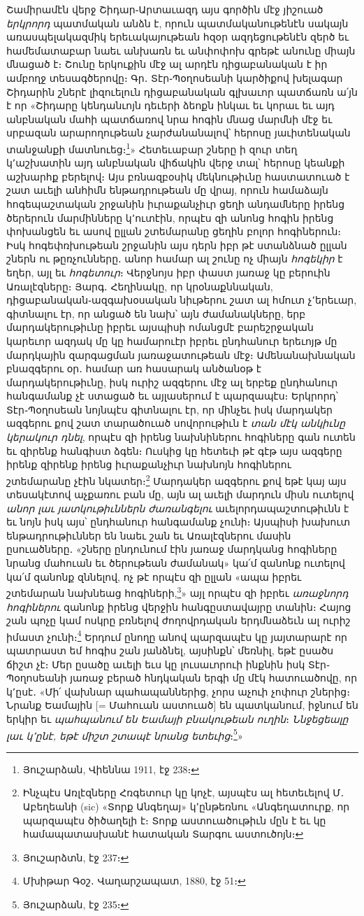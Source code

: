 \documentclass{article}
\begin{document}
{Շամիրամէն վերջ Շիդար֊Արտաւազդ այս գործին մէջ յիշուած \emph{երկրորդ} պատմական անձն է, որուն պատմականութենէն սակայն առասպելակազմիկ երեւակայութեան հզօր ազդեցութենէն զերծ եւ համեմատաբար նաեւ անխառն եւ անփոփոխ գրեթէ անունը միայն մնացած է։ Շունը երկուքին մէջ ալ արդէն դիցաբանական է իր ամբողջ տեսագծերովը։ Գր․ Տէր֊Պօղոսեանի կարծիքով խելագար Շիդարին շներէ լիզուելուն դիցաբանական գլխաւոր պատճառն ա՛յն է որ «Շիդարը կենդանւոյն դեւերի ձեոքն ինկաւ եւ կորաւ եւ այդ անբնական մահի պատճառով նրա հոգին մնաց մարմնի մէջ եւ սրբազան արարողութեան չարժանանալով՝ հերոսը յաւիտենական տանջանքի մատնուեց։\footnote{Յուշարձան, Վիեննա 1911, էջ 238։}» Հետեւաբար շները ի զուր տեղ կ՚աշխատին այդ անբնական վիճակին վերջ տալ՝ հերոսը կեանքի աշխարհք բերելով։ Այս բռնազբօսիկ մեկնութիւնը հաստատուած է շատ աւելի անհիմն ենթադրութեան մը վրայ, որուն համաձայն հոգեպաշտական շրջանին իւրաքանչիւր ցեղի անդամները իրենց ծերերուն մարմինները կ՚ուտէին, որպէս զի անոնց հոգին իրենց փոխանցեն եւ ասով ըլլան շտեմարանը ցեղին բոլոր հոգիներուն։ Իսկ հոգեփռխութեան շրջանին այս դերն իբր թէ ստանձնած ըլլան շներն ու թըռչունները․ անոր համար ալ շունը ոչ միայն \emph{հոգեկիր} է եղեր, այլ եւ \emph{հոգետուր}։ Վերջնոյս իբր փաստ յառաջ կը բերուին Առալէզները։ Յարգ․ Հեղինակը, որ կրօնաքննական, դիցաբանական֊ազգախօսական նիւթերու շատ ալ հմուտ չ՚երեւար, գիտնալու էր, որ անցած են նախ՝ այն ժամանակները, երբ մարդակերութիւնը իբրեւ այսպիսի ոմանցմէ բարեշրջական կարեւոր ազդակ մը կը համարուէր իբրեւ ընդհանուր երեւոյթ մը մարդկային զարգացման յառաջատութեան մէջ։ Ամենանախնական բնազգերու օր․ համար առ հասարակ անծանօթ է մարդակերութիւնը, իսկ ուրիշ ազգերու մէջ ալ երբեք ընդհանուր հանգամանք չէ ստացած եւ այլասերում է պարզապէս։ Երկրորդ՝ Տէր֊Պօղոսեան նոյնպէս գիտնալու էր, որ մինչեւ իսկ մարդակեր ազգերու քով շատ տարածուած սովորութիւն է \emph{տան մէկ անկիւնը կերակուր դնել}, որպէս զի իրենց նախնիներու հոգիները գան ուտեն եւ զիրենք հանգիստ ձգեն։ Ուսկից կը հետեւի թէ գէթ այս ազգերը իրենք զիրենք իրենց իւրաքանչիւր նախնոյն հոգիներու շտեմարանը չէին նկատեր։\footnote{Ինչպէս Առլէզները Հռգետուր կը կոչէ, այսպէս ալ հետեւելով Մ․ Աբեղեանի (sic) «Տորք Անգեղայ» կ՚ընթեռնու «Անգեղատուրք, որ պարզապէս ծիծաղելի է։ Տորք աստուածութիւն մըն է եւ կը համապատասխանէ հատական Տարգու աստուծոյն։} Մարդակեր ազգերու քով եթէ կայ այս տեսակէտով աչքառու բան մը, այն ալ աւելի մարդուն միսն ուտելով \emph{անոր լաւ յատկութիւններն ժառանգելու} աւելորդապաշտութիւնն է եւ նոյն իսկ այս՝ ընդհանուր հանգամանք չունի։ Այսպիսի խախուտ ենթադրութիւններ են նաեւ շան եւ Առալէզներու մասին ըսուածները․ «շները ընդունում էին յառաջ մարդկանց հոգիները նրանց մահուան եւ ծերութեան ժամանակ» կա՛մ զանոնք ուտելով կա՛մ զանոնք զննելով, ոչ թէ որպէս զի ըլլան «ապա իբրեւ շտեմարան նախնեաց հոգիների,\footnote{Յուշարձտն, էջ 237։}» այլ որպէս զի իբրեւ \emph{առաջնորդ հոգիներու} զանոնք իրենց վերջին հանգըստավայրը տանին։ Հայոց շան պոչը կամ ոսկրը բռնելով ժողովրդական երդմնաձեւն ալ ուրիշ իմաստ չունի։\footnote{Մխիթար Գօշ․ Վաղարշապատ, 1880, էջ 51։} Երդում ընողը անով պարզապէս կը յայտարարէ որ պատրաստ եմ հոգիս շան յանձնել, այսինքն՝ մեռնիլ, եթէ ըսածս ճիշտ չէ։ Մեր ըսածը աւելի եւս կը լուսաւորուի ինքնին իսկ Տէր֊Պօղոսեանի յառաջ բերած հնդկական երգի մը մէկ հատուածովը, որ կ՚ըսէ․ «Մի՛ վախնար պահապաններից, չորս աչուի չոփուր շներից։ Նրանք Եամային [= Մահուան աստուած] են պատկանում, իջնում են երկիր եւ \emph{պահպանում են Եամայի բնակութեան ուղին}։ \emph{Ննջեցեալը լաւ կ՚ընէ, եթէ միշտ շտապէ նրանց ետեւից}։\footnote{Յուշարձան, էջ 235։}»

}
\end{document}
